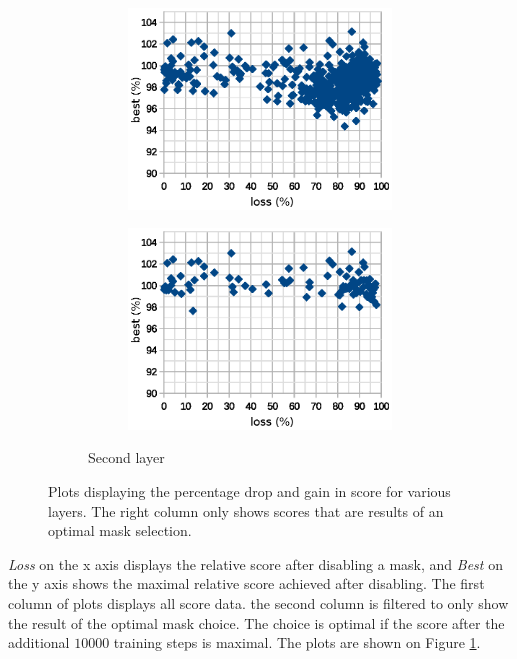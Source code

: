 \documentclass[12pt]{report}
\begin{document}
\begin{figure}[!ht]
\begin{subfigure}[b]{\linewidth}
\begin{subfigure}[b]{0.49\linewidth}
			\includegraphics[scale=0.7]{dia/all_second.eps}
		\end{subfigure}
		\begin{subfigure}[b]{0.49\linewidth}
			\centering
			\includegraphics[scale=0.7]{dia/best_second.eps}
		\end{subfigure}
		\caption{Second layer}
	\end{subfigure}
	\caption{Plots displaying the percentage drop and gain in score for various layers. The right column only shows scores that are results of an optimal mask selection.}\label{plots}
\end{figure}

\textit{Loss} on the x axis displays the relative score after disabling a mask, and \textit{Best} on the y axis shows the maximal relative score achieved after disabling. The first column of plots displays all score data. the second column is filtered to only show the result of the optimal mask choice. The choice is optimal if the score after the additional $10000$ training steps is maximal. The plots are shown on Figure \ref{plots}.
\end{document}
